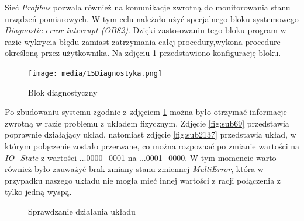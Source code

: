 \documentclass{article}
\begin{document}
\restoregeometry
\newpage
Sieć \textit{Profibus} pozwala również na komunikacje zwrotną do monitorowania stanu urządzeń pomiarowych. W tym celu należało użyć specjalnego bloku systemowego \textit{Diagnostic error interrupt (OB82)}. Dzięki zastosowaniu tego bloku program w razie wykrycia błędu zamiast zatrzymania całej procedury,wykona procedure określoną przez użytkownika. Na zdjęciu \ref{fig:diag} przedstawiono konfigurację bloku.


\begin{figure}[H]
    \centering
    \texttt{[image: media/15Diagnostyka.png]}
    \caption{Blok diagnostyczny}
    \label{fig:diag}    
\end{figure}
\newpage
Po zbudowaniu systemu zgodnie z zdjęciem \ref{fig:diag} można było otrzymać informacje zwrotną w razie problemu z układem fizycznym. Zdjęcie \ref{fig:sub69} przedstawia poprawnie działający układ, natomiast zdjęcie \ref{fig:sub2137} przedstawia układ, w którym połączenie zostało przerwane, co można rozpoznać po zmianie wartości na \textit{IO\_State} z wartości ...0000\_0001 na ...0001\_0000. W tym momencie warto również było zauważyć brak zmiany stanu zmiennej \textit{MultiError}, która w przypadku naszego układu nie mogła mieć innej wartości z racji połączenia z tylko jedną wyspą.


\begin{figure}[!ht]
    \centering
        \hfill
    \caption{Sprawdzanie działania układu}
    \label{fig:main420}
\end{figure}
\end{document}
